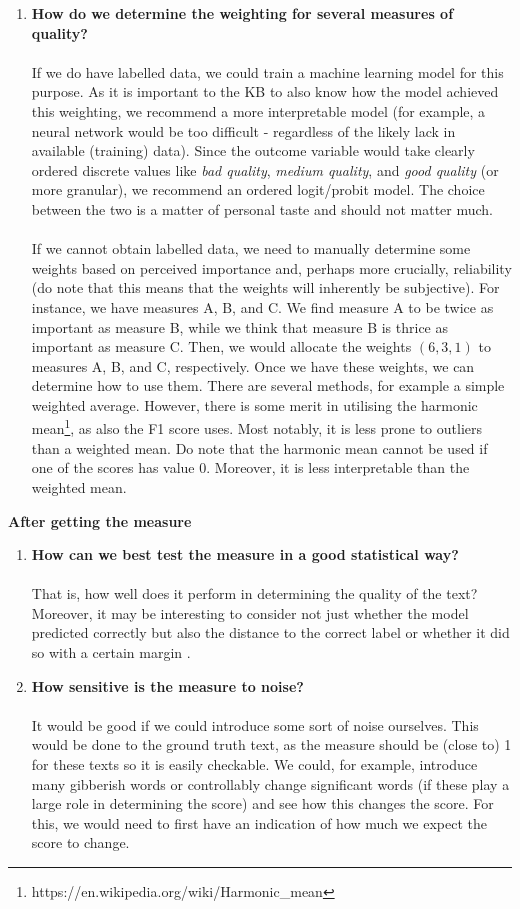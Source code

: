 \documentclass{article}
\begin{document}
\begin{enumerate}
		\item \textbf{How do we determine the weighting for several measures of quality?}
		\\ \\
		If we do have labelled data, we could train a machine learning model for this purpose. As it is important to the KB to also know how the model achieved this weighting, we recommend a more interpretable model (for example, a neural network would be too difficult - regardless of the likely lack in available (training) data). Since the outcome variable would take clearly ordered discrete values like \textit{bad quality}, \textit{medium quality}, and \textit{good quality} (or more granular), we recommend an ordered logit/probit model. The choice between the two is a matter of personal taste and should not matter much.
		\\ \\
		If we cannot obtain labelled data, we need to manually determine some weights based on perceived importance and, perhaps more crucially, reliability (do note that this means that the weights will inherently be subjective). For instance, we have measures A, B, and C. We find measure A to be twice as important as measure B, while we think that measure B is thrice as important as measure C. Then, we would allocate the weights $(6, 3, 1)$ to measures A, B, and C, respectively. Once we have these weights, we can determine how to use them. There are several methods, for example a simple weighted average. However, there is some merit in utilising the harmonic mean\footnote{https://en.wikipedia.org/wiki/Harmonic\_mean}, as also the F1 score uses. Most notably, it is less prone to outliers than a weighted mean. Do note that the harmonic mean cannot be used if one of the scores has value 0. Moreover, it is less interpretable than the weighted mean.
	\end{enumerate}
	
	\textbf{After getting the measure}
	\begin{enumerate}
		\item \textbf{How can we best test the measure in a good statistical way?}
		\\ \\
		That is, how well does it perform in determining the quality of the text? Moreover, it may be interesting to consider not just whether the model predicted correctly but also the distance to the correct label or whether it did so with a certain margin \cite{rennie2005loss}.
		\item \textbf{How sensitive is the measure to noise?} 
		\\ \\
		It would be good if we could introduce some sort of noise ourselves. This would be done to the ground truth text, as the measure should be (close to) 1 for these texts so it is easily checkable. We could, for example, introduce many gibberish words or controllably change significant words (if these play a large role in determining the score) and see how this changes the score. For this, we would need to first have an indication of how much we expect the score to change.
	\end{enumerate}
	
\end{document}
